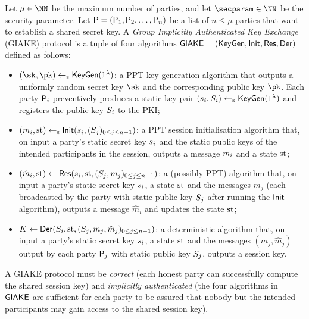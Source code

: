 \begin{plaindef}[GIAKE]\label{def:GKE}
	Let $\mu \in \NN$ be the maximum number of parties, and let $\secparam\in \NN$ be the security parameter. 
	Let $\PartySet = (\User[1],\User[2],\dots,\allowbreak \User[n])$ be a list of $n \leq \mu$ parties that want to establish a shared secret key.
	A \textit{Group Implicitly Authenticated Key Exchange} (GIAKE) protocol is a tuple of four algorithms $\GIAKE = (\KeyGen, \GAKEIni, \GAKERes, \GAKEDer)$ defined as follows:
	\begin{itemize}
		\item $(\sk,\pk) \getsr \KeyGen(1^\secpar)$: a PPT key-generation algorithm that outputs a uniformly random secret key $\sk$ and the corresponding public key $\pk$.
		Each party $\User[i]$ preventively produces a static key pair $(\ssk_i,\spk_i) \getsr \KeyGen(1^\secpar)$ and registers the public key $\spk_i$ to the PKI;
		\item $(m_i,\st) \getsr \GAKEIni (\ssk_i,(\spk_j)_{0\leq j \leq n-1})$: a PPT session initialisation algorithm that, on input a party's static secret key $\ssk_i$ and the static public keys of the intended participants in the session, outputs a message $\messageIni$ and a state $\st$;
		\item $(\hat{m}_i,\st) \gets \GAKERes(\ssk_i,\st,(\spk_j,m_j)_{0\leq j \leq n-1})$: a (possibly PPT) algorithm that, on input a party's static secret key $\ssk_i$, a state $\st$ and the messages $m_j$ (each broadcasted by the party with static public key $\spk_j$ after running the $\GAKEIni$ algorithm), outputs a message $\hat{m}_i$ and updates the state $\st$;
		\item $K \gets \GAKEDer (\spk_i,\st,(\spk_j,m_j,\hat{m}_j)_{0\leq j \leq n-1})$: a deterministic algorithm that,  on input a party's static secret key $\ssk_i$, a state $\st$ and the messages $(m_j,\hat{m}_j)$ output by each party $\User[j]$ with static public key $\spk_j$, outputs a session key.
	\end{itemize}
	A GIAKE protocol must be \textit{correct} (each honest party can successfully compute the shared session key) and \textit{implicitly authenticated} (the four algorithms in $\GIAKE$ are sufficient for each party to be assured that nobody but the intended participants may gain access to the shared session key).
\end{plaindef}

